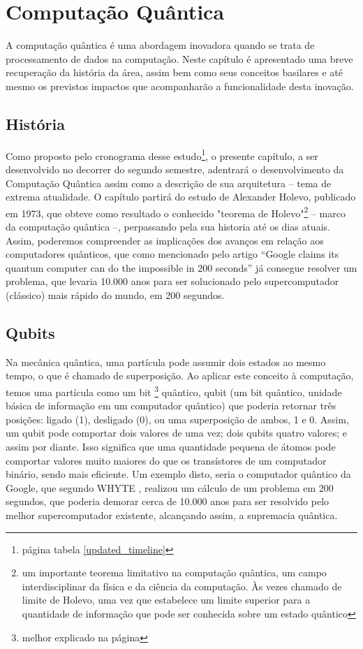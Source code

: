 \section{Computação Quântica} 
\label{quantum_comp}

A computação quântica é uma abordagem inovadora quando se trata de processamento de dados na computação. Neste capítulo é apresentado uma breve recuperação da história da área, assim bem como seus conceitos basilares e até mesmo os previstos impactos que acompanharão a funcionalidade desta inovação.

\subsection{História}
Como proposto pelo cronograma desse estudo\footnote{página \pageref{updated_timeline} tabela \ref{updated_timeline}}, o presente capítulo, a ser desenvolvido no decorrer do segundo semestre, adentrará o desenvolvimento da Computação Quântica assim como a descrição de sua arquitetura – tema de extrema atualidade. O capítulo partirá do estudo de Alexander Holevo, publicado em 1973, que obteve como resultado o conhecido "teorema de Holevo"\footnote{um importante teorema limitativo na computação quântica, um campo interdisciplinar da física e da ciência da computação. Às vezes chamado de limite de Holevo, uma vez que estabelece um limite superior para a quantidade de informação que pode ser conhecida sobre um estado quântico} – marco da computação quântica –, perpassando pela sua historia até os dias atuais. Assim, poderemos compreender as implicações dos avanços em relação aos computadores quânticos, que como mencionado pelo artigo “Google claims its quantum computer can do the impossible in 200 seconds” \cite{16} já consegue resolver um problema, que levaria 10.000 anos para ser solucionado pelo supercomputador (clássico) mais rápido do mundo, em 200 segundos.

\subsection{Qubits}
Na mecânica quântica, uma partícula pode assumir dois estados ao mesmo tempo, o que é chamado de superposição. Ao aplicar este conceito à computação, temos uma partícula como um bit \footnote{melhor explicado na página \pageref{bits}} quântico, qubit (um bit quântico, unidade básica de informação em um computador quântico) que poderia retornar três posições: ligado (1), desligado (0), ou uma superposição de ambos, 1 e 0. Assim, um qubit pode comportar dois valores de uma vez; dois qubits quatro valores; e assim por diante. Isso significa que uma quantidade pequena de átomos pode comportar valores muito maiores do que os transístores de um computador binário, sendo mais eficiente. Um exemplo disto, seria o computador quântico da Google, que segundo WHYTE \cite{20}, realizou um cálculo de um problema em 200 segundos, que poderia demorar cerca de 10.000 anos para ser resolvido pelo melhor supercomputador existente, alcançando assim, a supremacia quântica.

